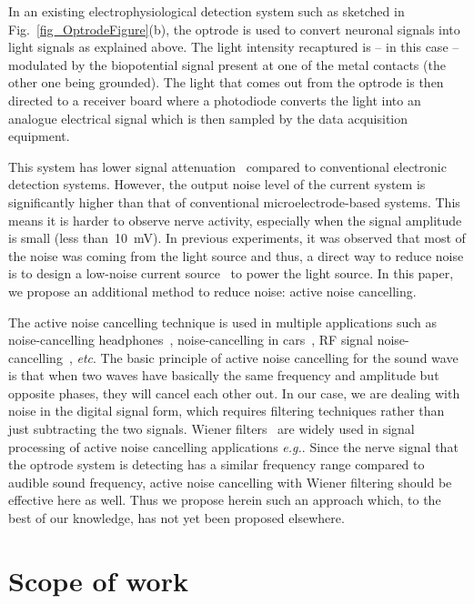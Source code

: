 In an existing electrophysiological  detection system such as sketched in Fig.~\ref{fig_OptrodeFigure}(b), the optrode is used to convert neuronal signals into light signals as explained above.  The light intensity recaptured is -- in this case -- modulated by the biopotential signal present at one of the metal contacts (the other one being grounded). The light that comes out from the optrode is then directed to a receiver board where a photodiode converts the light into an analogue electrical signal which is then sampled by the data acquisition equipment.

This system has lower signal attenuation~\cite{OptrodeArray,ImpedanceOfOptrode} compared to conventional electronic detection systems. However, the output noise level of the current system is significantly higher than that of conventional microelectrode-based systems. This means it is harder to observe nerve activity, especially when the signal amplitude is small (less than~\qty{10}{mV}).  In previous experiments, it was observed that most of the noise was coming from the light source and thus, a direct way to reduce noise is to design a low-noise current source~\cite{LowNoiseCurrentSource} to power the light source.  In this paper, we propose an additional method to reduce noise: active noise cancelling.

The active noise cancelling technique is used in multiple applications such as noise-cancelling headphones~\cite{ANC_Headphone_1,ANC_Headphone_2}, noise-cancelling in cars~\cite{ANC_Car}, RF signal noise-cancelling~\cite{ANC_RF}, {\em etc}.  The basic principle of active noise cancelling for the sound wave is that when two waves have basically the same frequency and amplitude but opposite phases, they will cancel each other out.  In our case, we are dealing with noise in the digital signal form, which requires filtering techniques rather than just subtracting the two signals.  Wiener filters~\cite{WienerFilter} are widely used in signal processing of active noise cancelling applications {\em e.g.}\cite{ANC_Wiener_2,ANC_Wiener_3}.  Since the nerve signal that the optrode system is detecting has a similar frequency range compared to audible sound frequency, active noise cancelling with Wiener filtering should be effective here as well. Thus we propose herein such an approach which, to the best of our knowledge, has not yet been proposed elsewhere.


\section{Scope of work}

